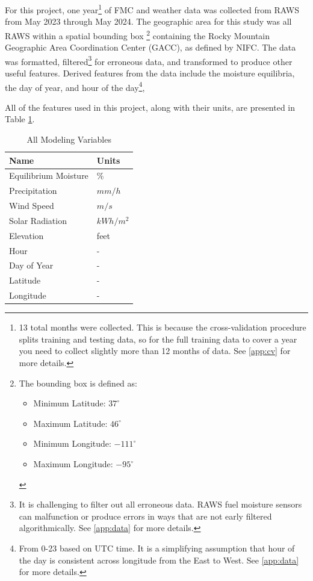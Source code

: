 \documentclass[11pt]{article}%
\begin{document}
For this project, one year\footnote{13 total months were collected. This is because the cross-validation procedure splits training and testing data, so for the full training data to cover a year you need to collect slightly more than 12 months of data. See \ref{app:cv} for more details.} of FMC and weather data was collected from RAWS from May 2023 through May 2024. The geographic area for this study was all RAWS within a spatial bounding box
\footnote{
The bounding box is defined as: 
\begin{itemize}
    \item Minimum Latitude: $37^\circ$\\
    \item Maximum Latitude: $46^\circ$\\
    \item Minimum Longitude: $-111^\circ$\\
    \item Maximum Longitude: $-95^\circ$ 
\end{itemize}
} 
containing the Rocky Mountain Geographic Area Coordination Center (GACC), as defined by NIFC.\cite{NIFC-GACC} The data was formatted,  filtered\footnote{It is challenging to filter out all erroneous data. RAWS fuel moisture sensors can malfunction or produce errors in ways that are not early filtered algorithmically. See \ref{app:data} for more details.} for erroneous data, and transformed to produce other useful features. Derived features from the data include the moisture equilibria, the day of year, and hour of the day\footnote{From 0-23 based on UTC time. It is a simplifying assumption that hour of the day is consistent across longitude from the East to West. See \ref{app:data} for more details.},


All of the features used in this project, along with their units, are presented in Table \ref{tab:all_vars}.

\begin{table}[ht]
\label{tab:all_vars}
\centering
\begin{tabular}{|l|l|}
\hline
\textbf{Name}           & \textbf{Units} \\  \hline
Equilibrium Moisture    & \%             \\ \hline
Precipitation           & $mm/h$           \\ \hline
Wind Speed              & $m/s$            \\ \hline
Solar Radiation         & $kWh/m^2$         \\ \hline
Elevation         & feet         \\ 
\hline
Hour                    & -              \\ 
\hline
Day of Year             & -              \\ 
\hline
Latitude                & -              \\ 
\hline
Longitude               & -              \\ 
\hline

\end{tabular}
\caption{All Modeling Variables}
\end{table}
\end{document}
